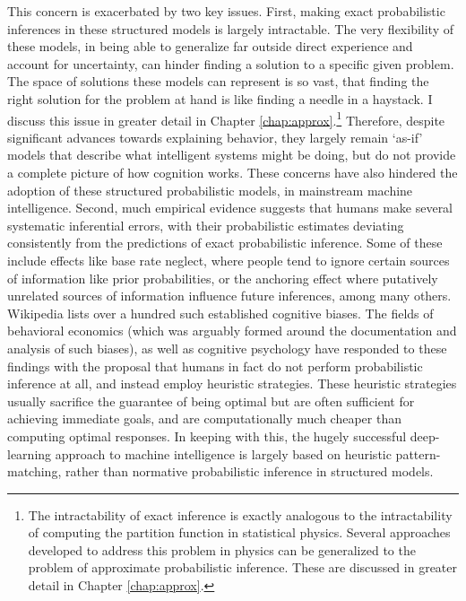 This concern is exacerbated by two key issues. First, making exact probabilistic inferences in these structured models is largely intractable. The very flexibility of these models, in being able to generalize far outside direct experience and account for uncertainty, can hinder finding a solution to a specific given problem. The space of solutions these models can represent is so vast, that finding the right solution for the problem at hand is like finding a needle in a haystack. I discuss this issue in greater detail in Chapter \ref{chap:approx}.\footnote{The intractability of exact inference is exactly analogous to the intractability of computing the partition function in statistical physics. Several approaches developed to address this problem in physics can be generalized to the problem of approximate probabilistic inference. These are discussed in greater detail in Chapter \ref{chap:approx}.} Therefore, despite significant advances towards explaining behavior, they largely remain `as-if' models that describe what intelligent systems might be doing, but do not provide a complete picture of how cognition works. These concerns have also hindered the adoption of these structured probabilistic models, in mainstream machine intelligence. Second, much empirical evidence suggests that humans make several systematic inferential errors, with their probabilistic estimates deviating consistently from the predictions of exact probabilistic inference. Some of these include effects like base rate neglect\citep{koehler1996base}, where people tend to ignore certain sources of information like prior probabilities, or the anchoring effect\citep{tversky} where putatively unrelated sources of information influence future inferences, among many others. Wikipedia lists over a hundred such established cognitive biases. The fields of behavioral economics\citep{kahneman1973psychology} (which was arguably formed around the documentation and analysis of such biases), as well as cognitive psychology\citep{phillips1966conservatism, gigerenzer1996reasoning} have responded to these findings with the proposal that humans in fact do not perform probabilistic inference at all, and instead employ heuristic strategies. These heuristic strategies usually sacrifice the guarantee of being optimal but are often sufficient for achieving immediate goals, and are computationally much cheaper than computing optimal responses. In keeping with this, the hugely successful deep-learning approach to machine intelligence is largely based on heuristic pattern-matching\citep{marcus2018deep, lake18}, rather than normative probabilistic inference in structured models. 


